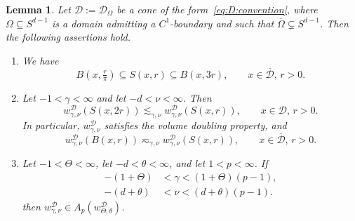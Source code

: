 \documentclass[12pt,a4paper, reqno]{amsart}
\theoremstyle{plain}
\newtheorem{lemma}[theorem]{Lemma}
\theoremstyle{definition}
\theoremstyle{remark}
\numberwithin{equation}{section}
\newcommand{\1}{\mathbbm{1}}
\newcommand{\calD}{\ensuremath{\mathcal{D}}}
\newcommand{\todoT}[1]{\todo[color=green,inline]{Tobias: #1}}
\begin{document}
\begin{lemma}\label{lem:doubling}
Let $\calD:=\calD_\Omega$ be a cone of the form~\eqref{eq:D:convention}, where $\Omega\subseteq S^{d-1}$ is a domain admitting a $C^1$-boundary and such that $\overline{\Omega}\subsetneq S^{d-1}$. Then the following assertions hold. 
\begin{enumerate}[label=\textup{(\roman*)}]
\item\label{it:ball:windshield} We have 
\[
B(x,\tfrac{r}{\pi})\subseteq S(x,r)\subseteq B(x,3r),\qquad x\in \overline{\calD},\, r>0.
\]
\item\label{it:mixedweights:doubling} Let $-1<\gamma<\infty$ and let $-d<\nu<\infty$. Then
\begin{equation}\label{eq:doubling:windshield}
w_{\gamma,\nu}^\calD(S(x,2r))
\lesssim_{\gamma,\nu}
w_{\gamma,\nu}^\calD(S(x,r)), \qquad x\in\calD,\, r>0.
\end{equation}
In particular, $w_{\gamma,\nu}^\calD$ satisfies the volume doubling property, and
\begin{equation}\label{eq:ball:windshield:equiv}
w_{\gamma,\nu}^\calD(B(x,r))
\eqsim_{\gamma,\nu}
w_{\gamma,\nu}^\calD(S(x,r)),\qquad x\in\overline{\calD},\,r>0.
\end{equation}

\item\label{it:mixedweights:Ap}     Let $-1<\Theta<\infty$, let $-d<\theta<\infty$, and let $1<p<\infty$. If 
\begin{equation}\label{weight:mixed:Muckenhoupt:range}\begin{aligned}
         -(1+\Theta) &<\gamma<(1+\Theta)(p-1),\\
     -(d+\theta) &<\nu<(d+\theta)(p-1).
\end{aligned}
 \end{equation}
 then $w_{\gamma,\nu}^\calD\in A_p(w_{\Theta,\theta}^\calD)$.
\end{enumerate}
\end{lemma}
\end{document}
